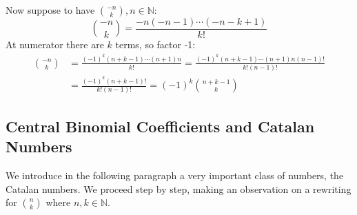 Now suppose to have ${{-n}\choose{k}}, n\in \mathbb{N}  $:
\begin{displaymath}
  {{-n}\choose{k}} =  \frac{-n(-n-1)\cdots(-n-k+1)}{k!}
\end{displaymath}
At numerator there are $k$ terms, so factor -1:
\begin{displaymath}
  \begin{split}
    {{-n}\choose{k}} &= \frac{(-1)^k (n + k-1)\cdots(n+1)n}{k!} =
    \frac{(-1)^k (n + k-1)\cdots(n+1)n(n-1)!}{k!(n-1)!}\\
    &= \frac{(-1)^k (n + k-1)!}{k!(n-1)!} = (-1)^k {{n+k-1}\choose{k}}
  \end{split}
\end{displaymath}

\subsection{Central Binomial Coefficients and Catalan Numbers}

We introduce in the following paragraph a very important class of
numbers, the Catalan numbers. We proceed step by step, making an
observation on a rewriting for ${{n}\choose{k}}$ where $n,k\in
\mathbb{N} $.

